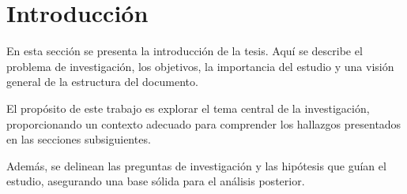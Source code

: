 \section{Introducción}
\label{sec:introduccion}

En esta sección se presenta la introducción de la tesis. Aquí se describe el problema de investigación, los objetivos, la importancia del estudio y una visión general de la estructura del documento.

El propósito de este trabajo es explorar el tema central de la investigación, proporcionando un contexto adecuado para comprender los hallazgos presentados en las secciones subsiguientes.

Además, se delinean las preguntas de investigación y las hipótesis que guían el estudio, asegurando una base sólida para el análisis posterior.